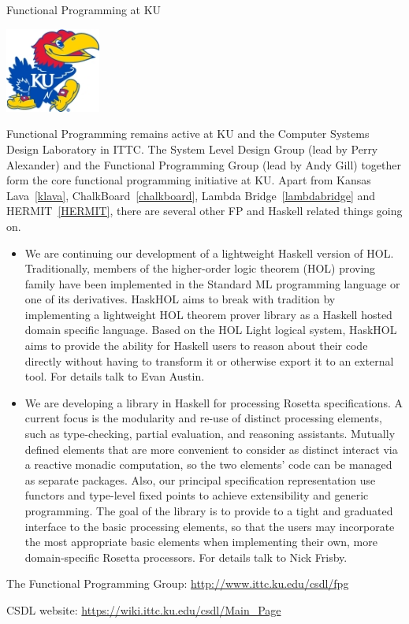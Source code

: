 \begin{hcarentry}[section]{Functional Programming at KU}
\makeheader

\begin{center}
\includegraphics[width=0.235\textwidth]{html/jh2.jpg}
\end{center}

Functional Programming remains active at KU and 
the Computer Systems Design Laboratory in ITTC.
The System Level Design Group (lead by Perry Alexander)
and the Functional Programming Group (lead by Andy Gill)
together form the core functional programming initiative at KU.
Apart from Kansas Lava~\cref{klava}, ChalkBoard~\cref{chalkboard}, 
Lambda Bridge~\cref{lambdabridge} and HERMIT~\cref{HERMIT},
there are several other
FP and Haskell related things going on.

\begin{itemize}

\item We are continuing our development of a lightweight Haskell version of HOL.
Traditionally, members of the higher-order logic theorem (HOL) proving family
have been implemented in the Standard ML programming language or one of its
derivatives. HaskHOL aims to break with tradition by implementing a lightweight
HOL theorem prover library as a Haskell hosted domain specific language. Based
on the HOL Light logical system, HaskHOL aims to provide the ability for Haskell
users to reason about their code directly without having to transform it or
otherwise export it to an external tool. For details talk to Evan Austin.

\item We are developing a library in Haskell for processing Rosetta
specifications. A current focus is the modularity and re-use of distinct
processing elements, such as type-checking, partial evaluation, and reasoning
assistants. Mutually defined elements that are more convenient to consider as
distinct interact via a reactive monadic computation, so the two elements' code
can be managed as separate packages. Also, our principal specification
representation use functors and type-level fixed points to achieve extensibility
and generic programming. The goal of the library is to provide to a tight and
graduated interface to the basic processing elements, so that the users may
incorporate the most appropriate basic elements when implementing their own,
more domain-specific Rosetta processors. For details talk to Nick Frisby.
\end{itemize}

\FurtherReading
\begin{compactitem}
\item   The Functional Programming Group:
    \url{http://www.ittc.ku.edu/csdl/fpg}

\item
  CSDL website: \url{https://wiki.ittc.ku.edu/csdl/Main_Page}
\end{compactitem}
\end{hcarentry}
